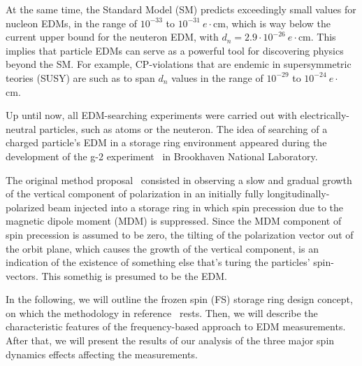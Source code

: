 \documentclass[preprint, review]{elsarticle}
\begin{document}
At the same time, the Standard Model (SM) predicts exceedingly small values for nucleon EDMs,
in the range of $10^{-33}$ to $10^{-31}~e\cdot$cm,
which is way below the current upper bound for the neuteron EDM,
with $d_n = 2.9\cdot 10^{-26}~e\cdot$cm. This implies that particle EDMs can serve as a powerful tool
for discovering physics beyond the SM. For example, CP-violations that are endemic in
supersymmetric teories (SUSY) are such as to span $d_n$ values in the range of
$10^{-29}$ to $10^{-24}~e\cdot$cm.~\cite{JEDI}

Up until now, all EDM-searching experiments were carried out with electrically-neutral particles, such as
atoms or the neuteron. The idea of searching of a charged particle's EDM in a storage ring environment
appeared during the development of the g-2 experiment~\cite{BNL:g-2:2001} in Brookhaven National Laboratory.

The original method proposal~\cite{BNL:Deuteron2008} consisted in observing a slow and gradual
growth of the vertical component of polarization in an initially fully longitudinally-polarized beam
injected into a storage ring in which spin precession due to the magnetic dipole moment (MDM) is suppressed.
Since the MDM component of spin precession is assumed to be zero, the tilting of the polarization vector
out of the orbit plane, which causes the growth of the vertical component, is an indication of the existence
of something else that's turing the particles' spin-vectors. This somethig is presumed to be the EDM.

In the following, we will outline the frozen spin (FS) storage ring design concept,
on which the methodology in reference~\cite{BNL:Deuteron2008} rests. Then, we will describe the characteristic
features of the frequency-based approach to EDM measurements. After that, we will present the results
of our analysis of the three major spin dynamics effects affecting the measurements.
\end{document}
